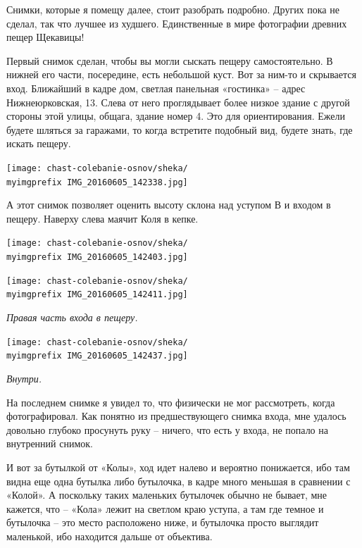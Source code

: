 Снимки, которые я помещу далее, стоит разобрать подробно. Других пока не сделал, так что лучшее из худшего. Единственные в мире фотографии древних пещер Щекавицы!

Первый снимок сделан, чтобы вы могли сыскать пещеру самостоятельно. В нижней его части, посередине, есть небольшой куст. Вот за ним-то и скрывается вход. Ближайший в кадре дом, светлая панельная «гостинка» – адрес Нижнеюрковская, 13. Слева от него проглядывает более низкое здание с другой стороны этой улицы, общага, здание номер 4. Это для ориентирования. Ежели будете шляться за гаражами, то когда встретите подобный вид, будете знать, где искать пещеру.

\begin{center}
\texttt{[image: chast-colebanie-osnov/sheka/\\myimgprefix IMG\_20160605\_142338.jpg]}
\end{center}

\newpage

А этот снимок позволяет оценить высоту склона над уступом В и входом в пещеру. Наверху слева маячит Коля в кепке.
\vspace*{\fill}
\begin{center}
\texttt{[image: chast-colebanie-osnov/sheka/\\myimgprefix IMG\_20160605\_142403.jpg]}
\end{center}
\vspace*{\fill}
\newpage

\begin{center}
\texttt{[image: chast-colebanie-osnov/sheka/\\myimgprefix IMG\_20160605\_142411.jpg]}

\textit{Правая часть входа в пещеру.}
\end{center}

   
\begin{center}
\texttt{[image: chast-colebanie-osnov/sheka/\\myimgprefix IMG\_20160605\_142437.jpg]}

\textit{Внутри.}
\end{center}

\newpage

На последнем снимке я увидел то, что физически не мог рассмотреть, когда фотографировал. Как понятно из предшествующего снимка входа, мне удалось довольно глубоко просунуть руку – ничего, что есть у входа, не попало на внутренний снимок. 

И вот за бутылкой от «Колы», ход идет налево и вероятно понижается, ибо там видна еще одна бутылка либо бутылочка, в кадре много меньшая в сравнении с «Колой». А поскольку таких маленьких бутылочек обычно не бывает, мне кажется, что – «Кола» лежит на светлом краю уступа, а там где темное и бутылочка – это место расположено ниже, и бутылочка просто выглядит маленькой, ибо находится дальше от объектива.

